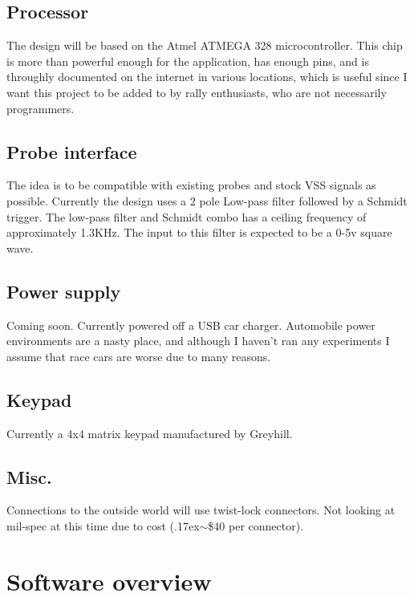 \documentclass[letterpaper,11pt]{article}
\begin{document}
\subsection{Processor}
The design will be based on the Atmel ATMEGA 328 microcontroller. This chip is more than powerful enough for the application, has enough pins, and is throughly documented on the internet in various locations, which is useful since I want this project to be added to by rally enthusiasts, who are not necessarily programmers.

\subsection{Probe interface}
The idea is to be compatible with existing probes and stock VSS signals as possible. Currently the design uses a 2 pole Low-pass filter followed by a Schmidt trigger. The low-pass filter and Schmidt combo has a ceiling frequency of approximately 1.3KHz. The input to this filter is expected to be a 0-5v square wave.

\subsection{Power supply}
Coming soon. Currently powered off a USB car charger. Automobile power environments are a nasty place, and although I haven't ran any experiments I assume that race cars are worse due to many reasons.

\subsection{Keypad}
Currently a 4x4 matrix keypad manufactured by Greyhill.

\subsection{Misc.}
Connections to the outside world will use twist-lock connectors. Not looking at mil-spec at this time due to cost ({\raise.17ex\hbox{$\scriptstyle\mathtt{\sim}$}}\$40 per connector). 

\section{Software overview}
\end{document}
